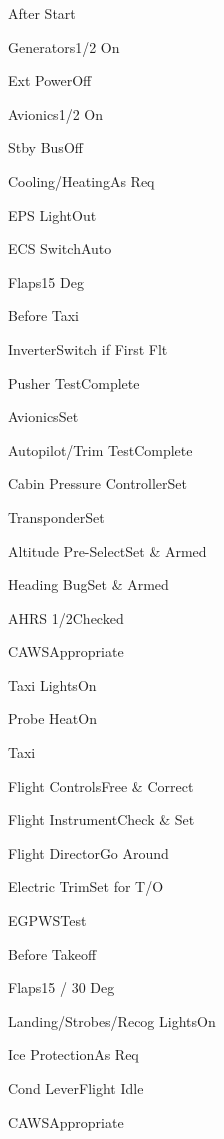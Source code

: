 \documentclass[sim-use]{checklist}
\begin{document}
\begin{checklist}{After Start}
  \item{Generators}{1/2 On}
  \item{Ext Power}{Off}
  \item{Avionics}{1/2 On}
  \item{Stby Bus}{Off}
  \item{Cooling/Heating}{As Req}
  \item{EPS Light}{Out}
  \item{ECS Switch}{Auto}
  \item{Flaps}{15 Deg}
\end{checklist}

\begin{checklist}{Before Taxi}
  \item{Inverter}{Switch if First Flt}
  \item{Pusher Test}{Complete}
  \item{Avionics}{Set}
  \item{Autopilot/Trim Test}{Complete}
  \item{Cabin Pressure Controller}{Set}
  \item{Transponder}{Set}
  \item{Altitude Pre-Select}{Set \& Armed}
  \item{Heading Bug}{Set \& Armed}
  \item{AHRS 1/2}{Checked}
  \item{CAWS}{Appropriate}
  \item{Taxi Lights}{On}
  \item{Probe Heat}{On}
\end{checklist}

\begin{checklist}{Taxi}
  \item{Flight Controls}{Free \& Correct}
  \item{Flight Instrument}{Check \& Set}
  \item{Flight Director}{Go Around}
  \item{Electric Trim}{Set for T/O}
  \item{EGPWS}{Test}
\end{checklist}

\begin{checklist}{Before Takeoff}
  \item{Flaps}{15 / 30 Deg}
  \item{Landing/Strobes/Recog Lights}{On}
  \item{Ice Protection}{As Req}
  \item{Cond Lever}{Flight Idle}
  \item{CAWS}{Appropriate}
\end{checklist}
\end{document}
